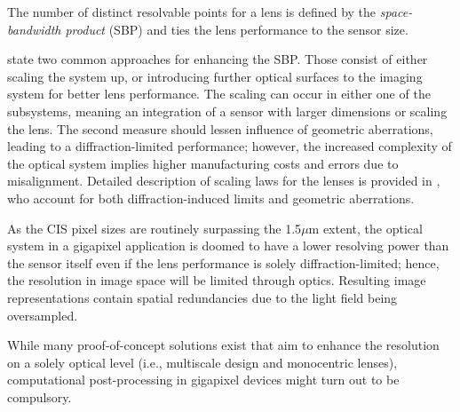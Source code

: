 The number of distinct resolvable points for a lens is defined by the \textit{space-bandwidth product} (SBP) \cite{Cossairt:11} and ties the lens performance to the sensor size.

\cite{GigaOptik} state two common approaches for enhancing the SBP. Those consist of either scaling the system up, or introducing further optical surfaces to the imaging system for better lens performance. The scaling can occur in either one of the subsystems, meaning an integration of a sensor with larger dimensions or scaling the lens.%
The second measure should lessen influence of geometric aberrations, leading to a diffraction-limited performance; however, the increased complexity of the optical system implies higher manufacturing costs and errors due to misalignment. Detailed description of scaling laws for the lenses is provided in \cite{Cossairt:11}, who account for both diffraction-induced limits and geometric aberrations.

As the CIS pixel sizes are routinely surpassing the 1.5$\mu$m extent, the optical system in a gigapixel application is doomed to have a lower resolving power than the sensor itself even if the lens performance is solely diffraction-limited; hence, the resolution in image space will be limited through optics. Resulting image representations contain spatial redundancies due to the light field being oversampled. 

While many proof-of-concept solutions exist that aim to enhance the resolution on a solely optical level (i.e., multiscale design and monocentric lenses), computational post-processing in gigapixel devices might turn out to be compulsory.
